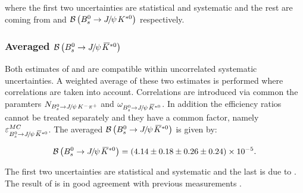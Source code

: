  \noindent where the first two uncertainties are statistical and systematic and the rest are coming from \fdfs and $\BRof\BdJpsiKst$ respectively.

\subsubsection{Averaged $\BRof\BsJpsiKst$}
Both estimates of  and  are compatible within uncorrelated systematic uncertainties.
A weighted average of these two estimates is performed where correlations are taken into account.
Correlations are introduced via common the paramters $N_{\BsJpsiKpi}$ and $\omega_{\BsJpsiKst}$.
In addition the efficiency ratios cannot be treated separately and they have a common factor,
namely $\varepsilon_{\BsJpsiKst}^{MC}$. The averaged $\BRof\BsJpsiKst$ is given by:

\begin{equation}
  \centering
\BRof\BsJpsiKst = (4.14 \pm 0.18 \pm 0.26 \pm 0.24 )\times 10^{-5}.
\label{Br_total}
\end{equation}

\noindent The first two uncertainties are statistical and systematic and the last is due to \fdfs.
The result of  is in good agreement with previous measurements \cite{Aaij:2012nh}.
